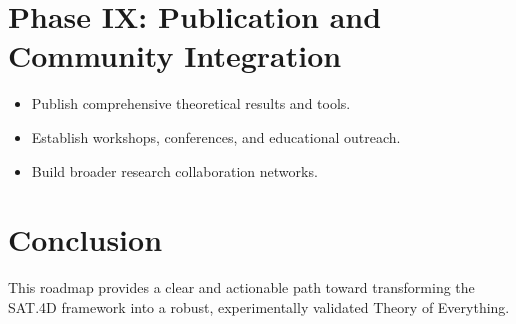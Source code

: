 \documentclass{article}
\begin{document}
\section{Phase IX: Publication and Community Integration}
\begin{itemize}
    \item Publish comprehensive theoretical results and tools.
    \item Establish workshops, conferences, and educational outreach.
    \item Build broader research collaboration networks.
\end{itemize}

\section*{Conclusion}
This roadmap provides a clear and actionable path toward transforming the SAT.4D framework into a robust, experimentally validated Theory of Everything.
\end{document}
